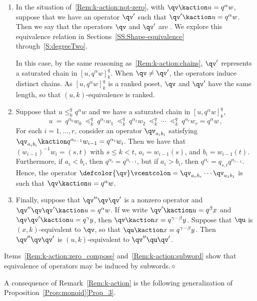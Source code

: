 \begin{remark}
\begin{enumerate}[label=(\roman*)]
  \item\label{Rem:k-action:uk_equiv}
    In the situation of~\ref{Rem:k-action:not-zero}, with $\qv\kaction u=q^\alpha w$, suppose that 
    we have an operator $\qv'$ such that $\qv'\kaction u=q^\alpha w$.
    Then we say that the operators $\qv$ and $\qv'$ are .
    We explore this equivalence relation in Sections~\ref{SS:Shape-equivalence} through~\ref{S:degreeTwo}. 

    In this case, by the same reasoning as~\ref{Rem:k-action:chains}, $\qv'$ represents a saturated chain in $[u,q^\alpha w]_k^q$.
    When $\qv\neq\qv'$, the operators induce distinct chains.
    As $[u,q^\alpha w]_k^q$ is a ranked poset, $\qv$ and $\qv'$ have the same length, so that $(u,k)$-equivalence is ranked.

  \item
    Suppose that $u\leq_k^q q^\alpha w$ and we have     a saturated chain in $[u,q^\alpha w]_k^q$, 
    \[
      u\ =\ q^{\alpha_0}w_0\ \lessdot_k^q\ q^{\alpha_1}w_1\ \lessdot_k^q\ q^{\alpha_2}w_2
      \ \lessdot_k^q\ \dotsb\  \lessdot_k^q\ q^{\alpha_r}w_r=q^\alpha w\,,
    \]
    For each $i=1,\dotsc,r$, consider an operator $\qv_{a_ib_i}$ satisfying $\qv_{a_ib_i}\kaction q^{\alpha_{i-1}}w_{i-1}=q^{\alpha_i}w_i$.
    Then we have that $(w_{i-1})^{-1}w_i=(s,t)$ with $s\leq k<t$,  $a_i=w_{i-1}(s)$, and $b_i=w_{i-1}(t)$.
    Furthermore, if $a_i<b_i$, then $q^{\alpha_i}=q^{\alpha_{i-1}}$, but if $a_i>b_i$, then  $q^{\alpha_i}=q_{s,t}q^{\alpha_{i-1}}$.
    Hence, the operator $\defcolor{\qv}\vcentcolon=\qv_{a_rb_r}\dotsb \qv_{a_1b_1}$ is such that
    $\qv\kaction u=q^\alpha w$.
    
  \item \label{Rem:k-action:subword}
    Finally, suppose that $\qv''\qv\qv'$ is a nonzero operator and $\qv''\qv\qv'\kaction u=q^\alpha w$.
    If we write $\qv'\kaction u=q^\beta x$ and $\qv\qv'\kaction u=q^\gamma y$, then $\qv\kaction x = q^{\gamma-\beta} y$.
    Suppose that $\qu$ is $(x,k)$-equivalent to $\qv$, so that $\qu\kaction x = q^{\gamma-\beta} y$.
    Then $\qv''\qv\qv'$ is $(u,k)$-equivalent to $\qv''\qu\qv'$.
    
\end{enumerate}

Items~\ref{Rem:k-action:zero_compose} and~\ref{Rem:k-action:subword} show that equivalence of operators may be induced by
subwords.\hfill$\diamond$ 
\end{remark}

A consequence of Remark~\ref{Rem:k-action} is the following generalization of Proposition~\ref{Prop:monoid}\eqref{Prop_3}.

